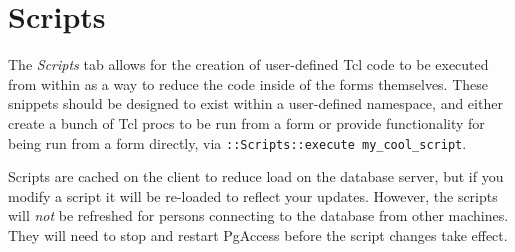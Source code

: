 \section{Scripts}
The \emph{Scripts} tab allows for the creation of user-defined Tcl code to be 
executed from within  as a way to reduce the code inside 
of the forms themselves. These snippets should be designed to exist within a 
user-defined namespace, and either create a bunch of Tcl procs to be run from 
a form or provide functionality for being run from a form directly, via 
\texttt{::Scripts::execute my\_cool\_script}.

Scripts are cached on the client to reduce load on the database server, but 
if you modify a script it will be re-loaded to reflect your updates.  However, 
the scripts will \emph{not} be refreshed for persons connecting to the database 
from other machines. They will need to stop and restart PgAccess before the 
script changes take effect.

